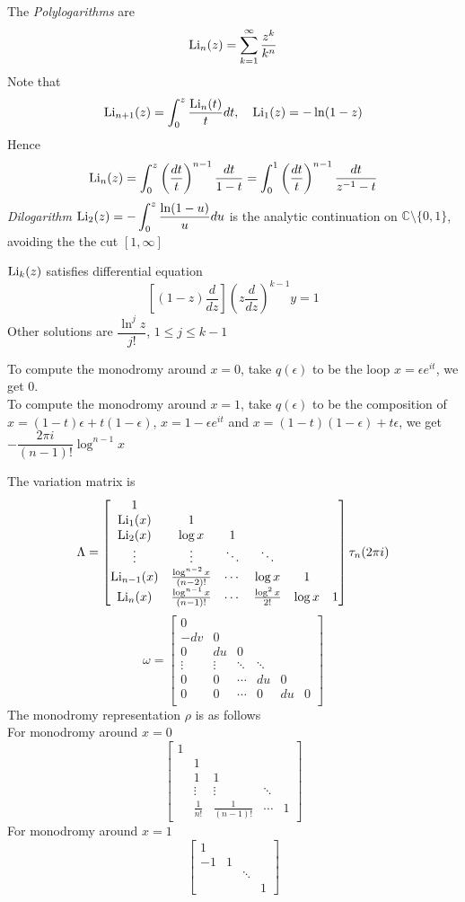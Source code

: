 \documentclass[main]{subfiles}
\begin{document}
\begin{definition}
The \textit{Polylogarithms} are
\[\displaystyle\operatorname{Li}_n(z)=\sum_{k=1}^\infty\dfrac{z^k}{k^n}\]
Note that
\[\operatorname{Li}_{n+1}(z)=\displaystyle\int_0^z\frac{\operatorname{Li}_n(t)}{t}dt,\quad\operatorname{Li}_1(z)=-\ln(1-z)\]
Hence
\[\operatorname{Li}_n(z)=\int_0^z\left(\frac{dt}{t}\right)^{n-1}\frac{dt}{1-t}=\int_0^1\left(\frac{dt}{t}\right)^{n-1}\frac{dt}{z^{-1}-t}\]
\textit{Dilogarithm} $\displaystyle\operatorname{Li}_2(z)=-\int_{0}^z\frac{\ln(1-u)}{u}du$ is the analytic continuation on $\mathbb C\setminus\{0,1\}$, avoiding the the cut $[1,\infty]$
\end{definition}

\begin{lemma}
$\operatorname{Li}_k(z)$ satisfies differential equation
\[\left[(1-z)\frac{d}{dz}\right]\left(z\frac{d}{dz}\right)^{k-1}y=1\]
Other solutions are $\dfrac{\ln^jz}{j!}$, $1\leq j\leq k-1$
\end{lemma}

To compute the monodromy around $x=0$, take $q(\epsilon)$ to be the loop $x=\epsilon e^{it}$, we get $0$. \\
To compute the monodromy around $x=1$, take $q(\epsilon)$ to be the composition of $x=(1-t)\epsilon+t(1-\epsilon)$, $x=1-\epsilon e^{it}$ and $x=(1-t)(1-\epsilon)+t\epsilon$, we get $-\dfrac{2\pi i}{(n-1)!}\log^{n-1} x$

The variation matrix is
\[\Lambda=\begin{bmatrix}
1&\\
\operatorname{Li}_1(x)&1&\\
\operatorname{Li}_2(x)&\log x&1\\
\vdots&\vdots&\ddots&\ddots\\
\operatorname{Li}_{n-1}(x)&\frac{\log^{n-2}x}{(n-2)!}&\cdots&\log x&1& \\
\operatorname{Li}_n(x)&\frac{\log^{n-1}x}{(n-1)!}&\cdots&\frac{\log^2x}{2!}&\log x&1
\end{bmatrix}\tau_n(2\pi i)\]
\[\omega=\begin{bmatrix}
0\\
-dv&0\\
0&du&0\\
\vdots&\vdots&\ddots&\ddots\\
0&0&\cdots&du&0\\
0&0&\cdots&0&du&0 \\
\end{bmatrix}\]
The monodromy representation $\rho$ is as follows \\
For monodromy around $x=0$
\[\begin{bmatrix}
1 \\
&1 \\
&1&1\\
&\vdots&\vdots&\ddots\\
&\frac{1}{n!}&\frac{1}{(n-1)!}&\cdots&1
\end{bmatrix}\]
For monodromy around $x=1$
\[\begin{bmatrix}
1 \\
-1&1 \\
&&\ddots\\
&&&1
\end{bmatrix}\]
\end{document}
